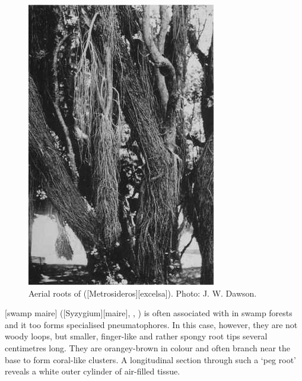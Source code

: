 \begin{figure}[t]
\begin{minipage}[t]{\textwidth}
		\begin{minipage}[t]{(\textwidth-\fgap-\fgap) * \real{0.372}}
			\centering
			\includegraphics[width=\textwidth]{graphics/fig_015}
			\caption[Aerial roots of pohutukawa]{Aerial roots of  ([Metrosideros][excelsa]).
			Photo:  J. W. Dawson.}%
			\label{fig:15pohutakawa}
		\end{minipage}
	\end{minipage}
\end{figure}

[swamp maire] ([Syzygium][maire], , ) is often associated with  in swamp forests and it too forms specialised pneumatophores.
In this case, however, they are not woody loops, but smaller, finger-like and rather spongy root tips several centimetres long.
They are orangey-brown in colour and often branch near the base to form coral-like clusters.
A longitudinal section through such a `peg root' reveals a white outer cylinder of air-filled tissue.

